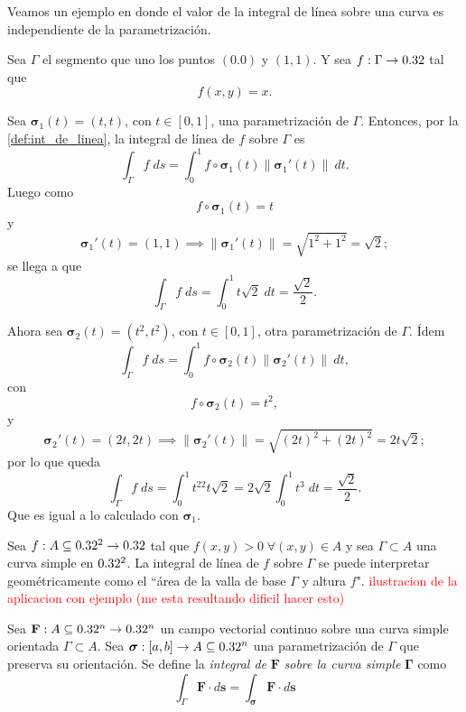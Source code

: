 \begin{example}
    Veamos un ejemplo en donde el valor de la integral de l\'inea sobre una curva es independiente de la parametrización. 
    
    Sea $\Gamma$ el segmento que uno los puntos $(0.0)$ y $(1,1)$. Y sea $f:\Gamma\to0.32$ tal que
    \[
        f(x,y)=x.
    \]

    Sea $\boldsymbol{\sigma}_1(t)=(t,t)$, con $t\in[0,1]$, una parametrización de $\Gamma$. Entonces, por la \autoref{def:int_de_linea}, la integral de l\'inea de $f$ sobre $\Gamma$ es
    \[
        \int_\Gamma f\;ds=\int_0^1f\circ\boldsymbol{\sigma}_1(t)\|\boldsymbol{\sigma}_1'(t)\|\:dt.
    \]
    Luego como
    \[
        f\circ\boldsymbol{\sigma}_1(t)=t
    \]
    y
    \[
        \boldsymbol{\sigma}_1'(t)=(1,1)\implies\|\boldsymbol{\sigma}_1'(t)\|=\sqrt{1^2+1^2}=\sqrt{2};
    \]
    se llega a que
    \[
        \int_\Gamma f\;ds=\int_0^1t\sqrt{2}\;dt=\frac{\sqrt{2}}{2}.
    \]

    Ahora sea $\boldsymbol{\sigma}_2(t)=(t^2,t^2)$, con $t\in[0,1]$, otra parametrización de $\Gamma$. \'Idem
    \[
        \int_\Gamma f\;ds=\int_0^1f\circ\boldsymbol{\sigma}_2(t)\|\boldsymbol{\sigma}_2'(t)\|\:dt,
    \]
    con
    \[
        f\circ\boldsymbol{\sigma}_2(t)=t^2,
    \]
    y
    \[
        \boldsymbol{\sigma}_2'(t)=(2t,2t)\implies\|\boldsymbol{\sigma}_2'(t)\|=\sqrt{(2t)^2+(2t)^2}=2t\sqrt{2};
    \]
    por lo que queda
    \[
        \int_\Gamma f\;ds=\int_0^1t^22t\sqrt{2}=2\sqrt{2}\int_0^1t^3\;dt=\frac{\sqrt{2}}{2}.
    \]
    Que es igual a lo calculado con $\boldsymbol{\sigma}_1$.
  \end{example}  

\begin{obs} 
 Sea $f:A\subseteq0.32^2 \to0.32$   tal que  $f(x,y)>0 \; \forall (x,y) \in A$ y   sea $\Gamma \subset A$ una curva simple en $0.32^2$.   La integral de l\'inea de $f$ sobre $\Gamma$  se puede interpretar geom\'etricamente como el ``\'area de la valla de base $\Gamma$ y altura $f$". 
\textcolor{red}{ilustracion de la aplicacion con ejemplo (me esta resultando dificil hacer esto)}
\end{obs}

\begin{definition}
    Sea $\mathbf{F}:A\subseteq0.32^n\to0.32^n$ un campo vectorial continuo sobre una curva simple orientada $\Gamma\subset A$. Sea $\boldsymbol{\sigma}:[a,b]\to A\subseteq0.32^n$ una parametrizaci\'on de $\Gamma$ que preserva su orientaci\'on. Se define la \emph{integral de} $\mathbf{F}$ \emph{sobre la curva simple} $\boldsymbol{\Gamma}$ como
    \[
        \int_{\Gamma}\mathbf{F}\cdot d\mathbf{s}=\int_{\boldsymbol{\sigma}}\mathbf{F}\cdot d\mathbf{s} 
    \]
\end{definition}

